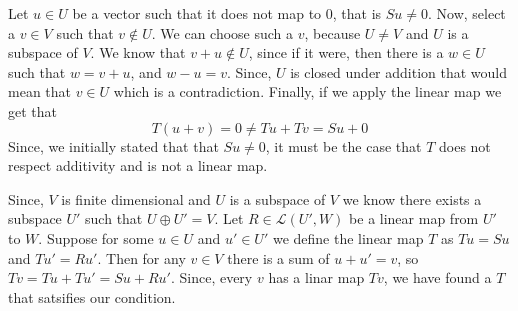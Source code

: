 \documentclass[10pt, twocolumn]{article}
\begin{document}
\begin{q}[10]
	Let $ u \in U $ be a vector such that it does not map to 0, that is $ Su \neq 0 $. 
	Now, select a $ v \in V $ such that $ v \not\in U $. 
	We can choose such a $ v $, because $ U \neq V $ and $ U $ is a subspace of $ V $. 
	We know that $ v + u \not\in U $, since if it were, then there is a $ w \in U $ such that $ w = v + u $, 
	and $ w - u = v $. 
	Since, $ U $ is closed under addition that would mean that $ v \in U $ which is a contradiction. 
	Finally, if we apply the linear map we get that 
	$$ T(u + v)	 = 0 \neq Tu + Tv = Su + 0 $$
	Since, we initially stated that that $ Su \neq 0 $, it must be the case that $ T $ does not respect additivity and is not a linear map. 
\end{q}
\begin{q}[11]
	Since, $ V $ is finite dimensional and $ U $ is a subspace of $ V $ we know there exists a subspace $ U' $
	such that $ U \oplus U' = V $. 
	Let $ R \in \mathcal{L}(U', W) $ be a linear map from $U'$ to $ W $. 
	Suppose for some $ u \in U $ and $ u' \in U'$ we define the linear map $ T $ as
	$ Tu = Su $ and $ Tu' = Ru' $. 
	Then for any $ v \in V $ there is a sum of $ u + u' = v $, so  $ Tv = Tu + Tu' = Su + Ru' $. 
	Since, every $ v $ has a linar map $ Tv $, we have found a $ T $ that satsifies our condition.
\end{q}
\begin{q}[12]
			
\end{q}
\end{document}
